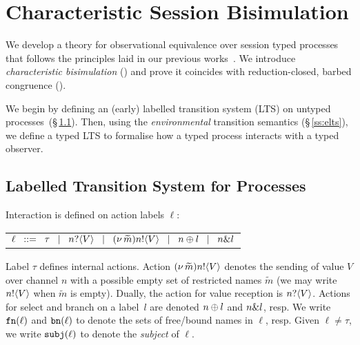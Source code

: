 \documentclass[a4paper,UKenglish]{lipics}
\theoremstyle{definition}
\begin{document}

\section{Characteristic Session Bisimulation}
\label{sec:behavioural}
 
\noi We develop a theory for observational equivalence over
session typed \HOp processes that follows the principles
laid in our previous works~\cite{KYHH2015,KY2015}.
We introduce 
\emph{characteristic bisimulation} ()
and prove
it coincides
with reduction-closed,
barbed congruence ().

We begin by defining an (early) labelled transition system (LTS) on
untyped processes~(\S\,\ref{ss:lts}). 
Then, using the \emph{environmental} transition semantics (\S\,\ref{ss:elts}), 
we define a typed LTS to formalise 
how a typed process interacts with a typed observer. 

\subsection{Labelled Transition System for Processes}\label{ss:lts}

Interaction is defined on action labels $\ell$:
\begin{center}
\begin{tabular}{l}
	$\ell	\;\;::=\;\;   \tau 
		\;\;\;|\;\;\;	n ? \langle V \rangle 
		\;\;\;|\;\;\;	(\nu\, \widetilde{m}) n ! \langle V \rangle
		\;\;\;|\;\;\;	n \oplus l 
		\;\;\;|\;\;\;	n \& l $
\end{tabular}
\end{center}
\noi 
Label $\tau$ defines internal actions.
Action $(\nu\, \widetilde{m}) n ! \langle V \rangle$ denotes the sending of value $V$
over channel $n$ with
a possible empty set of restricted names $\widetilde{m}$ 
(we may write $n ! \langle V \rangle$ when $\widetilde{m}$ is empty).
Dually, the action for value reception is 
$n ? \langle V \rangle$.
Actions for select
and branch on
a label~$l$ are denoted $n \oplus l$ and $n \& l$, resp.
We write $\mathtt{fn}(\ell)$ and $\mathtt{bn}(\ell)$ to denote the
 sets of free/bound names in $\ell$, resp.
Given $\ell \neq \tau$, we write 
$\mathtt{subj}(\ell)$
to denote the \emph{subject} of $\ell$.
\end{document}
